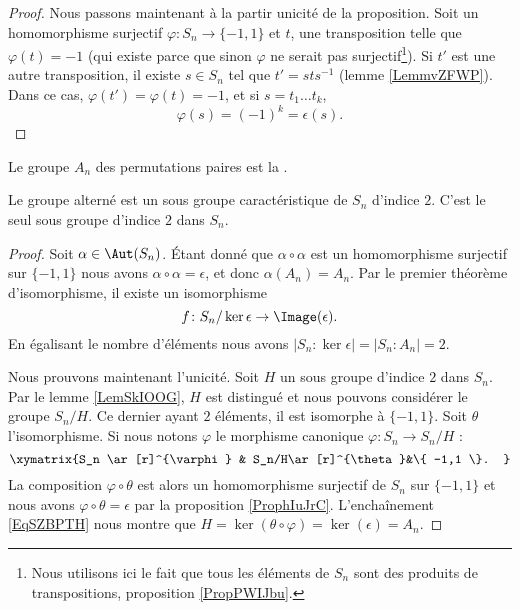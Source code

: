 \begin{proof}
    Nous passons maintenant à la partir unicité de la proposition. Soit un homomorphisme surjectif \( \varphi\colon S_n\to \{ -1,1 \}\) et \( t\), une transposition telle que \( \varphi(t)=-1\) (qui existe parce que sinon \( \varphi\) ne serait pas surjectif\footnote{Nous utilisons ici le fait que tous les éléments de \( S_n\) sont des produits de transpositions, proposition \ref{PropPWIJbu}.}). Si \( t'\) est une autre transposition, il existe \( s\in S_n\) tel que \( t'=sts^{-1}\) (lemme \ref{LemmvZFWP}). Dans ce cas, \( \varphi(t')=\varphi(t)=-1\), et si \( s=t_1\ldots t_k\),
    \begin{equation}
         \varphi(s)=(-1)^k=\epsilon(s).
    \end{equation}
\end{proof}

Le groupe \( A_n\) des permutations paires est la .

\begin{proposition}
    Le groupe alterné est un sous groupe caractéristique de \( S_n\) d'indice \( 2\). C'est le seul sous groupe d'indice \( 2\) dans \( S_n\).
\end{proposition}

\begin{proof}
    Soit \( \alpha\in \Aut(S_n)\). Étant donné que \( \alpha\circ\alpha\) est un homomorphisme surjectif sur \( \{ -1,1 \}\) nous avons \( \alpha\circ\alpha=\epsilon\), et donc \( \alpha(A_n)=A_n\). Par le premier théorème d'isomorphisme, il existe un isomorphisme
    \begin{equation}
        f\colon S_n/\ker\epsilon\to \Image(\epsilon).
    \end{equation}
    En égalisant le nombre d'éléments nous avons \( | S_n:\ker\epsilon |=| S_n:A_n |=2\).

    Nous prouvons maintenant l'unicité. Soit \( H\) un sous groupe d'indice \( 2\) dans \( S_n\). Par le lemme \ref{LemSkIOOG}, \( H\) est distingué et nous pouvons considérer le groupe \( S_n/H\). Ce dernier ayant \( 2\) éléments, il est isomorphe à \( \{ -1,1 \}\). Soit \( \theta\) l'isomorphisme. Si nous notons \( \varphi\) le morphisme canonique \( \varphi\colon S_n\to S_n/H\) :
    \begin{equation}    \label{EqSZBPTH}
        \xymatrix{%
        S_n \ar[r]^{\varphi}        &   S_n/H\ar[r]^{\theta}&\{ -1,1 \}.
           }
    \end{equation}
    La composition \( \varphi\circ \theta\) est alors un homomorphisme surjectif de \( S_n\) sur \( \{ -1,1 \}\) et nous avons \( \varphi\circ\theta=\epsilon\) par la proposition \ref{ProphIuJrC}. L'enchaînement \eqref{EqSZBPTH} nous montre que \( H=\ker(\theta\circ\varphi)=\ker(\epsilon)=A_n\).
\end{proof}

